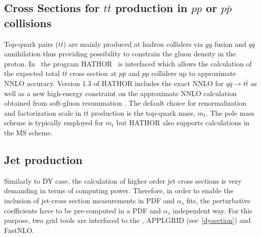 \subsection{Cross Sections for \texorpdfstring{$t\bar{t}$}{t-tbar} production in $pp$ or $p\bar p$ collisions}
%
Top-quark pairs ($t\bar{t}$) are mainly produced at hadron colliders via $gg$ fusion and
$q \bar q$ annihilation thus providing possibility to constrain the gluon density in the proton. 
In \fitter\ the program HATHOR~\cite{Aliev:2010zk} is interfaced which allows the calculation of 
the expected total $t \bar t$ cross section at 
$p \bar p$ and $p p$ colliders up to approximate NNLO accuracy.
Version 1.3 of HATHOR includes the exact NNLO for $q \bar q \to t \bar t$ \cite{Baernreuther:2012ws}
as well as a new high-energy constraint on the approximate NNLO calculation obtained from
soft-gluon resummation \cite{Moch:2012mk}.
The default choice for renormalization and factorization scale in $t \bar t$ production is the top-quark mass, $m_t$.
The pole mass scheme is typically employed for $m_t$ but HATHOR also supports calculations in
the $\overline{\text{MS}}$ scheme.

\subsection{Jet production}
\label{jetsection}

Similarly to DY case, the calculation of higher order jet cross sections 
is very demanding in terms of computing power. 
Therefore, in order to enable the inclusion of jet-cross section 
measurements in PDF and $\alpha_s$ fits, the perturbative
coefficients have to be pre-computed in a PDF and $\alpha_s$ 
independent way. For this purpose, two grid tools are
interfaced to the \fitter , APPLGRID (see~\ref{dysection}) and 
FastNLO.

